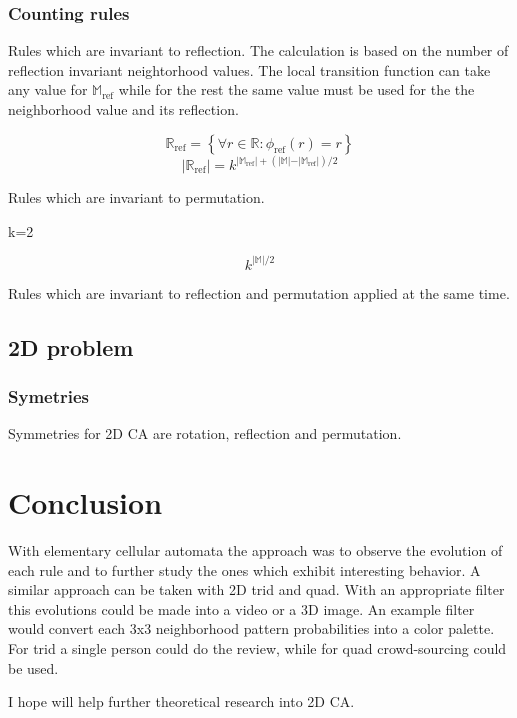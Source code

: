 \documentclass{ijuc}
\begin{document}
\subsubsection{Counting rules}

Rules which are invariant to reflection. The calculation is based on the number of reflection invariant neightorhood values.
The local transition function can take any value for $\mathbb{M}_\mathrm{ref}$ while for the rest the same value must be used
for the the neighborhood value and its reflection.

\[ \mathbb{R}_\mathrm{ref} = \left\{ \forall r \in \mathbb{R} : \phi_\mathrm{ref}(r) = r \right\} \]
\[ \vert \mathbb{R}_\mathrm{ref} \vert = k^{ \vert \mathbb{M}_\mathrm{ref} \vert + ( \vert \mathbb{M} \vert - \vert \mathbb{M}_\mathrm{ref} \vert ) / 2 } \]

Rules which are invariant to permutation.

k=2

\[ k^{\vert \mathbb{M} \vert / 2} \]

Rules which are invariant to reflection and permutation applied at the same time.



\subsection{2D problem}

\subsubsection{Symetries}

Symmetries for 2D CA are rotation, reflection and permutation.

\section{Conclusion}

With elementary cellular automata the approach was to observe the evolution of
each rule and to further study the ones which exhibit interesting behavior.
A similar approach can be taken with 2D trid and quad. With an appropriate filter
this evolutions could be made into a video or a 3D image. An example filter would
convert each 3x3 neighborhood pattern probabilities into a color palette. For trid
a single person could do the review, while for quad crowd-sourcing could be used.

I hope will help further theoretical research into 2D CA.



\appendix 
\end{document}
